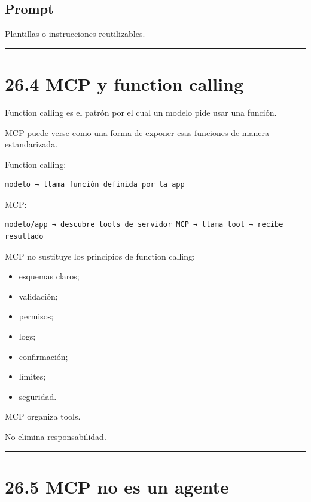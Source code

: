 \subsection{Prompt}\label{prompt-1}

Plantillas o instrucciones reutilizables.

\begin{center}\rule{0.5\linewidth}{0.5pt}\end{center}

\section{26.4 MCP y function calling}\label{mcp-y-function-calling}

Function calling es el patrón por el cual un modelo pide usar una
función.

MCP puede verse como una forma de exponer esas funciones de manera
estandarizada.

Function calling:

\begin{lstlisting}
modelo → llama función definida por la app
\end{lstlisting}

MCP:

\begin{lstlisting}
modelo/app → descubre tools de servidor MCP → llama tool → recibe resultado
\end{lstlisting}

MCP no sustituye los principios de function calling:

\begin{itemize}
\tightlist
\item
  esquemas claros;
\item
  validación;
\item
  permisos;
\item
  logs;
\item
  confirmación;
\item
  límites;
\item
  seguridad.
\end{itemize}

MCP organiza tools.

No elimina responsabilidad.

\begin{center}\rule{0.5\linewidth}{0.5pt}\end{center}

\section{26.5 MCP no es un agente}\label{mcp-no-es-un-agente}

